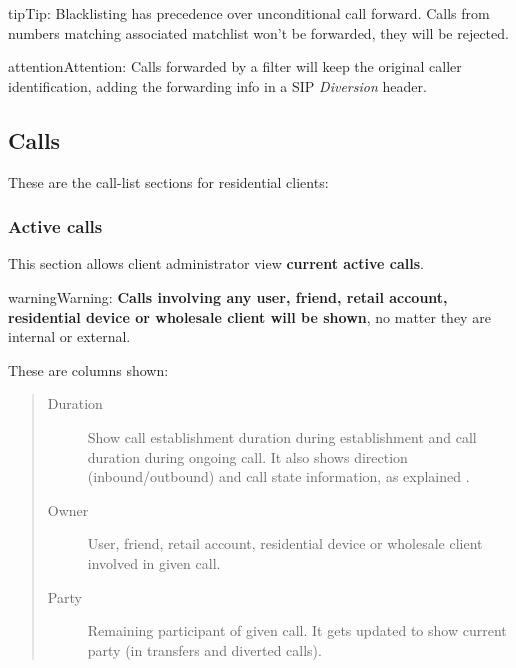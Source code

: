 \documentclass[letterpaper,10pt,english]{sphinxmanual}
\begin{document}
\begin{notice}{tip}{Tip:}
Blacklisting has precedence over unconditional call forward. Calls from numbers
matching associated matchlist won't be forwarded, they will be rejected.
\end{notice}

\begin{notice}{attention}{Attention:}
Calls forwarded by a filter will keep the original
caller identification, adding the forwarding info in a SIP
\emph{Diversion} header.
\end{notice}


\subsection{Calls}
\label{administration_portal/client/residential/calls/index::doc}\label{administration_portal/client/residential/calls/index:calls}
These are the call-list sections for residential clients:


\subsubsection{Active calls}
\label{administration_portal/client/residential/calls/active_calls::doc}\label{administration_portal/client/residential/calls/active_calls:active-calls}
This section allows client administrator view \textbf{current active calls}.

\begin{notice}{warning}{Warning:}
\textbf{Calls involving any user, friend, retail account, residential device or wholesale client will be shown},
no matter they are internal or external.
\end{notice}

These are columns shown:
\begin{quote}
\begin{description}
\item[{Duration}] \leavevmode
Show call establishment duration during establishment and call duration during ongoing call. It also shows
direction (inbound/outbound) and call state information, as explained {\hyperref[administration_portal/platform/active_calls:call\string-state]{}}.

\item[{Owner}] \leavevmode
User, friend, retail account, residential device or wholesale client involved in given call.

\item[{Party}] \leavevmode
Remaining participant of given call. It gets updated to show current party (in transfers and diverted calls).

\end{description}
\end{quote}
\end{document}
